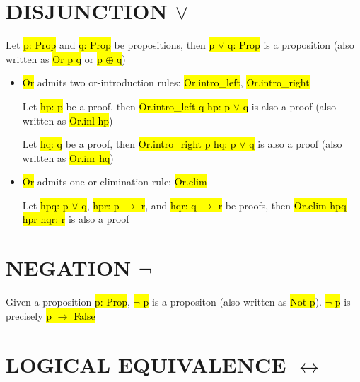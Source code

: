 \section{DISJUNCTION $\lor$}

Let \hl{p: Prop} and \hl{q: Prop} be propositions, then \hl{p $\lor$ q: Prop} is a proposition (also written as \hl{Or p q} or \hl{p $\oplus$ q})

\begin{itemize}
	\item \hl{Or} admits two or-introduction rules: \hl{Or.intro\_left}, \hl{Or.intro\_right}
	
	Let \hl{hp: p} be a proof, then \hl{Or.intro\_left q hp: p $\lor$ q} is also a proof (also written as \hl{Or.inl hp})
	
	Let \hl{hq: q} be a proof, then \hl{Or.intro\_right p hq: p $\lor$ q} is also a proof (also written as \hl{Or.inr hq})
	
	\item \hl{Or} admits one or-elimination rule: \hl{Or.elim}
	
	Let \hl{hpq: p $\lor$ q}, \hl{hpr: p $\to$ r}, and \hl{hqr: q $\to$ r} be proofs, then \hl{Or.elim hpq hpr hqr: r} is also a proof
\end{itemize}

\begin{center}
\end{center}

\section{NEGATION $\lnot$}

Given a proposition \hl{p: Prop}, \hl{$\lnot$ p} is a propositon (also written as \hl{Not p}). \hl{$\lnot$ p} is precisely \hl{p $\to$ False}

\section{LOGICAL EQUIVALENCE $\leftrightarrow$}

